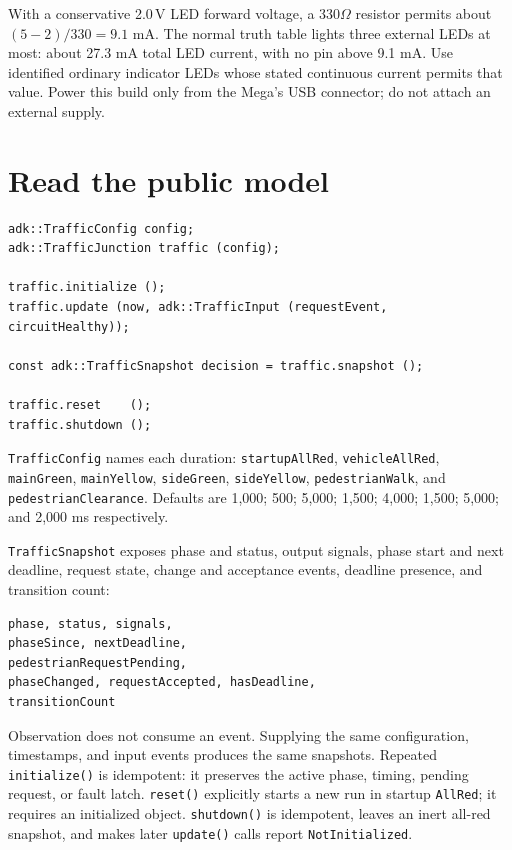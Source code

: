 \documentclass[11pt]{article}
\begin{document}
With a conservative 2.0\,V LED forward voltage, a 330\(\Omega\) resistor
permits about \((5-2)/330=9.1\) mA. The normal truth table lights three
external LEDs at most: about 27.3 mA total LED current, with no pin above
9.1 mA. Use identified ordinary indicator LEDs whose stated continuous
current permits that value. Power this build only from the Mega's USB
connector; do not attach an external supply.

\section{Read the public model}

\begin{lstlisting}[style=adkcpp]
adk::TrafficConfig config;
adk::TrafficJunction traffic (config);

traffic.initialize ();
traffic.update (now, adk::TrafficInput (requestEvent, circuitHealthy));

const adk::TrafficSnapshot decision = traffic.snapshot ();

traffic.reset    ();
traffic.shutdown ();
\end{lstlisting}

\texttt{TrafficConfig} names each duration:
\texttt{startupAllRed}, \texttt{vehicleAllRed}, \texttt{mainGreen},
\texttt{mainYellow}, \texttt{sideGreen}, \texttt{sideYellow},
\texttt{pedestrianWalk}, and \texttt{pedestrianClearance}. Defaults are
1,000; 500; 5,000; 1,500; 4,000; 1,500; 5,000; and 2,000 ms respectively.

\texttt{TrafficSnapshot} exposes phase and status, output signals, phase start
and next deadline, request state, change and acceptance events, deadline
presence, and transition count:

\begin{lstlisting}[style=adkcpp]
phase, status, signals,
phaseSince, nextDeadline,
pedestrianRequestPending,
phaseChanged, requestAccepted, hasDeadline,
transitionCount
\end{lstlisting}

Observation does not consume an event. Supplying the same configuration,
timestamps, and input events produces the same snapshots. Repeated
\texttt{initialize()} is idempotent: it preserves the active phase, timing,
pending request, or fault latch. \texttt{reset()} explicitly starts a new run
in startup \texttt{AllRed}; it requires an initialized object.
\texttt{shutdown()} is idempotent, leaves an inert all-red snapshot, and makes
later \texttt{update()} calls report \texttt{NotInitialized}.
\end{document}
